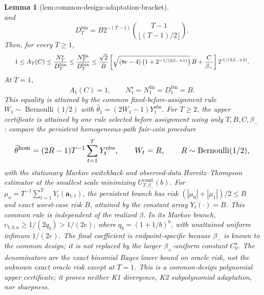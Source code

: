 \documentclass{article}
\newtheorem{lemma}{Lemma}
\begin{document}
\begin{lemma}[lem:common-design-adaptation-bracket]
\[\] and \[D_T^{\mathrm{bin}}=B2^{-(T-1)}\binom{T-1}{\lfloor(T-1)/2\rfloor}.\] Then, for every \(T\ge1\), \[
\makebox[\linewidth][c]{\resizebox{0.98\linewidth}{!}{\leavevmode\par\noindent \makebox[\linewidth][c]{\resizebox{0.98\linewidth}{!}{\(\displaystyle \displaystyle 1\le A_T(C)\le\frac{N_T^\star}{D_T^{\mathrm{bin}}}\le\frac{N_T^{\mathrm{fin}}}{D_T^{\mathrm{bin}}}\le\frac{\sqrt2}{B}\left[\sqrt{(8e-4)\left(1+2^{-1/(2\beta_-+1)}\right)}\,B+\frac C{\beta_-}\right]T^{1/(4\beta_-+2)}.\)}}\par\noindent}}
\] At \(T=1\), \[A_1(C)=1,\qquad N_1^\star=N_1^{\mathrm{fin}}=D_1^{\mathrm{bin}}=B.\] This equality is attained by the common fixed-before-assignment rule \(W_1\sim\operatorname{Bernoulli}(1/2)\) with \(\widehat\theta_1=(2W_1-1)Y_1^{\mathrm{obs}}\). For \(T\ge2\), the upper certificate is attained by one rule selected before assignment using only \(T,B,C,\beta_-\): compare the persistent homogeneous-path fair-coin procedure \[
\makebox[\linewidth][c]{\resizebox{0.98\linewidth}{!}{\leavevmode\par\noindent \makebox[\linewidth][c]{\resizebox{0.98\linewidth}{!}{\(\displaystyle \displaystyle \widehat\theta^{\mathrm{hom}}=(2R-1)T^{-1}\sum_{t=1}^T Y_t^{\mathrm{obs}},\qquad W_t=R,\qquad R\sim\operatorname{Bernoulli}(1/2),\)}}\par\noindent}}
\] with the stationary Markov switchback and observed-data Horvitz--Thompson estimator at the smallest scale minimizing \(U_{T,\beta_-}^{\mathrm{cond}}(b)\). For \(\mu_a=T^{-1}\sum_{t=1}^T Y_t(\mathbf a_{1:t})\), the persistent branch has risk \((|\mu_0|+|\mu_1|)/2\le B\) and exact worst-case risk \(B\), attained by the constant array \(Y_t(\cdot)=B\). This common rule is independent of the realized \(\beta\). In its Markov branch, \(\upsilon_{t,b,a}\ge1/(2q_b)>1/(2e)\), where \(q_b=(1+1/b)^b\), with unattained uniform infimum \(1/(2e)\). The final coefficient is endpoint-specific because \(\beta_-\) is known to the common design; it is not replaced by the larger \(\beta_+\)-uniform constant \(C_0^\star\). The denominators are the exact binomial Bayes lower bound on oracle risk, not the unknown exact oracle risk except at \(T=1\). This is a common-design polynomial upper certificate; it proves neither K1 divergence, K2 subpolynomial adaptation, nor sharpness.
\end{lemma}
\end{document}
